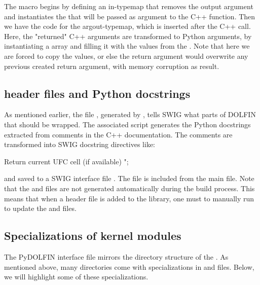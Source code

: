 The macro begins by defining an in-typemap that removes the output argument
and instantiates the  that will be passed as argument to
the C++ function. Then we have the code for the argout-typemap, which is inserted after the
C++ call. Here, the "returned" C++ arguments are transformed to Python
arguments, by instantiating a \numpy array  and filling it with
the values from the . Note that here we are forced to copy
the values, or else the return argument would overwrite any previous created return argument, with memory corruption as result.


\subsection{\dolfin header files and Python docstrings}
As mentioned earlier, the file , generated by  
, tells SWIG what parts of DOLFIN that should be wrapped. 
The associated script  generates the Python
docstrings extracted from comments in the C++ documentation.  
The comments are transformed into SWIG docstring directives like:
\begin{swigcode}
Return current UFC cell (if available)
";
\end{swigcode}
and saved to a SWIG interface file . The
 file is included from the main  file.
Note that the  and  files are not
generated automatically during the build process. This means that when a 
header file is added to the \dolfin library, one must to manually run
 to update the  and  files.


\subsection{Specializations of kernel modules}
The PyDOLFIN interface file  
mirrors the directory structure of the . 
As mentioned above, many directories come with specializations in
 and  files.  
Below, we will highlight some of these specializations. 

